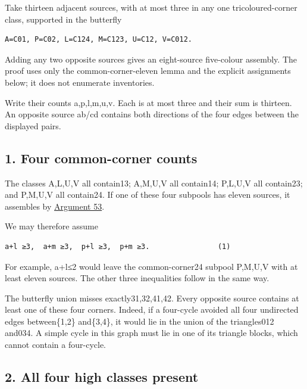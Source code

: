 \documentclass[
  10pt,
]{article}
\begin{document}
Take thirteen adjacent sources, with at most three in any one
tricoloured-corner class, supported in the butterfly

\begin{verbatim}
A=C01, P=C02, L=C124, M=C123, U=C12, V=C012.
\end{verbatim}

Adding any two opposite sources gives an eight-source five-colour
assembly. The proof uses only the common-corner-eleven lemma and the
explicit assignments below; it does not enumerate inventories.

Write their counts a,p,l,m,u,v. Each is at most three and their sum is
thirteen. An opposite source ab/cd contains both directions of the four
edges between the displayed pairs.

\hypertarget{four-common-corner-counts}{%
\subsection*{1. Four common-corner
counts}\label{four-common-corner-counts}}

The classes A,L,U,V all contain13; A,M,U,V all contain14; P,L,U,V all
contain23; and P,M,U,V all contain24. If one of these four subpools has
eleven sources, it assembles by \protect\hyperlink{arg-53}{Argument 53}.

We may therefore assume

\begin{verbatim}
a+l ≥3,  a+m ≥3,  p+l ≥3,  p+m ≥3.                (1)
\end{verbatim}

For example, a+l≤2 would leave the common-corner24 subpool P,M,U,V with
at least eleven sources. The other three inequalities follow in the same
way.

The butterfly union misses exactly31,32,41,42. Every opposite source
contains at least one of these four corners. Indeed, if a four-cycle
avoided all four undirected edges between\{1,2\} and\{3,4\}, it would
lie in the union of the triangles012 and034. A simple cycle in this
graph must lie in one of its triangle blocks, which cannot contain a
four-cycle.

\hypertarget{all-four-high-classes-present}{%
\subsection*{2. All four high classes
present}\label{all-four-high-classes-present}}
\end{document}
